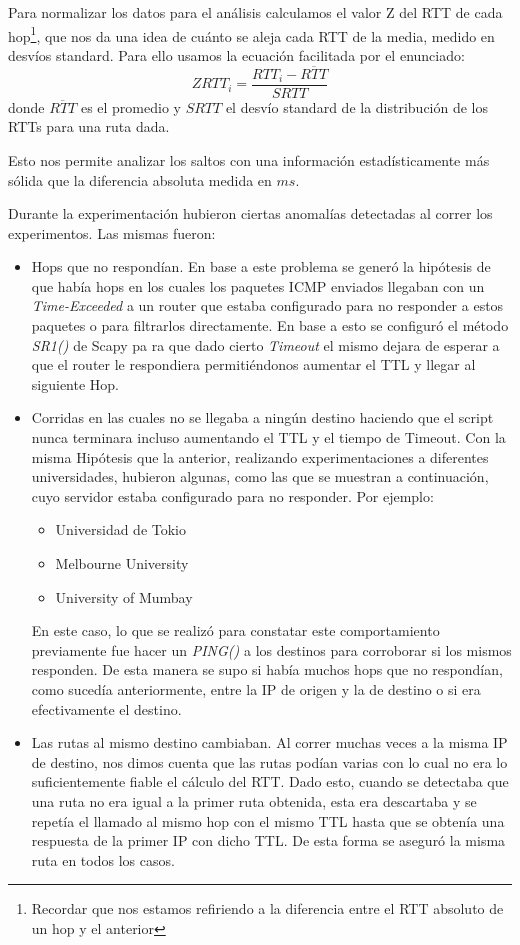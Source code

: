 Para normalizar los datos para el análisis calculamos el valor Z del RTT de cada hop\footnote{Recordar que nos estamos refiriendo a la diferencia entre el RTT absoluto de un hop y el anterior}, que nos da una idea de cuánto se aleja cada RTT de la media, medido en desvíos standard. Para ello usamos la ecuación facilitada por el enunciado: $$ ZRTT_i = \dfrac{RTT_i-\overline{RTT}}{SRTT}$$ donde $\overline{RTT}$ es el promedio y $SRTT$ el desvío standard de la distribución de los RTTs para una ruta dada.

Esto nos permite analizar los saltos con una información estadísticamente más sólida que la diferencia absoluta medida en $ms$.

Durante la experimentación hubieron ciertas anomalías detectadas al correr los experimentos. Las mismas fueron:

\begin{itemize}
    \item Hops que no respondían. En base a este problema se generó la hipótesis de que había hops en los cuales los paquetes ICMP enviados llegaban con un \textit{Time-Exceeded} a un router que estaba configurado para no responder a estos paquetes o para filtrarlos directamente. En base a esto se configuró el método \textit{SR1()} de Scapy pa ra que dado cierto \textit{Timeout} el mismo dejara de esperar a que el router le respondiera permitiéndonos aumentar el TTL y llegar al siguiente Hop.
    \item Corridas en las cuales no se llegaba a ningún destino haciendo que el script nunca terminara incluso aumentando el TTL y el tiempo de Timeout. Con la misma Hipótesis que la anterior, realizando experimentaciones a diferentes universidades, hubieron algunas, como las que se muestran a continuación, cuyo servidor estaba configurado para no responder. Por ejemplo:
    \begin{itemize}
        \item Universidad de Tokio
        \item Melbourne University
        \item University of Mumbay
    \end{itemize}
    En este caso, lo que se realizó para constatar este comportamiento previamente fue hacer un \textit{PING()} a los destinos para corroborar si los mismos responden. De esta manera se supo si había muchos hops que no respondían, como sucedía anteriormente, entre la IP de origen y la de destino o si era efectivamente el destino.
    \item Las rutas al mismo destino cambiaban. Al correr muchas veces a la misma IP de destino, nos dimos cuenta que las rutas podían varias con lo cual no era lo suficientemente fiable el cálculo del RTT. Dado esto, cuando se detectaba que una ruta no era igual a la primer ruta obtenida, esta era descartaba y se repetía el llamado al mismo hop con el mismo TTL hasta que se obtenía una respuesta de la primer IP con dicho TTL. De esta forma se aseguró la misma ruta en todos los casos.
\end{itemize}


